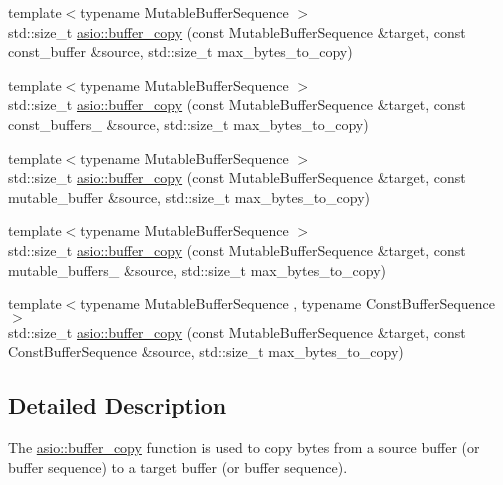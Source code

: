 \begin{DoxyCompactItemize}
\item 
{\footnotesize template$<$typename Mutable\+Buffer\+Sequence $>$ }\\std\+::size\+\_\+t \hyperlink{group__buffer__copy_ga8a4ac1b034c7a80d4e5ebbd858a9c727}{asio\+::buffer\+\_\+copy} (const Mutable\+Buffer\+Sequence \&target, const const\+\_\+buffer \&source, std\+::size\+\_\+t max\+\_\+bytes\+\_\+to\+\_\+copy)
\item 
{\footnotesize template$<$typename Mutable\+Buffer\+Sequence $>$ }\\std\+::size\+\_\+t \hyperlink{group__buffer__copy_gaa146b63f2bdc20a3c0bd5e4c4d8d0ead}{asio\+::buffer\+\_\+copy} (const Mutable\+Buffer\+Sequence \&target, const const\+\_\+buffers\+\_ \&source, std\+::size\+\_\+t max\+\_\+bytes\+\_\+to\+\_\+copy)
\item 
{\footnotesize template$<$typename Mutable\+Buffer\+Sequence $>$ }\\std\+::size\+\_\+t \hyperlink{group__buffer__copy_ga31d071ecd1fc863feac8d1ca303c4346}{asio\+::buffer\+\_\+copy} (const Mutable\+Buffer\+Sequence \&target, const mutable\+\_\+buffer \&source, std\+::size\+\_\+t max\+\_\+bytes\+\_\+to\+\_\+copy)
\item 
{\footnotesize template$<$typename Mutable\+Buffer\+Sequence $>$ }\\std\+::size\+\_\+t \hyperlink{group__buffer__copy_ga328a0f81f124d05c142465d3ebeeefeb}{asio\+::buffer\+\_\+copy} (const Mutable\+Buffer\+Sequence \&target, const mutable\+\_\+buffers\+\_ \&source, std\+::size\+\_\+t max\+\_\+bytes\+\_\+to\+\_\+copy)
\item 
{\footnotesize template$<$typename Mutable\+Buffer\+Sequence , typename Const\+Buffer\+Sequence $>$ }\\std\+::size\+\_\+t \hyperlink{group__buffer__copy_ga0552327b5c66c5f764476539909d3d15}{asio\+::buffer\+\_\+copy} (const Mutable\+Buffer\+Sequence \&target, const Const\+Buffer\+Sequence \&source, std\+::size\+\_\+t max\+\_\+bytes\+\_\+to\+\_\+copy)
\end{DoxyCompactItemize}


\subsection{Detailed Description}
The \hyperlink{group__buffer__copy_ga8bc8cbf49a91e58205de746721d614d8}{asio\+::buffer\+\_\+copy} function is used to copy bytes from a source buffer (or buffer sequence) to a target buffer (or buffer sequence). 

